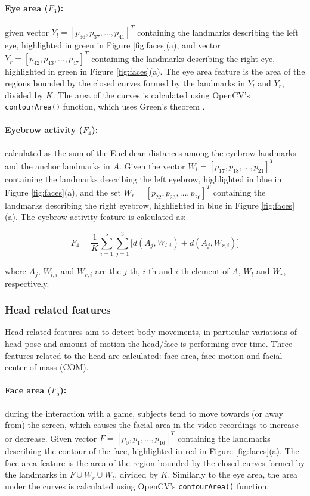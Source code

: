 \paragraph{Eye area ($F_3$):} given vector $Y_l = [p_{36}, p_{37}, \dots, p_{41}]^T$ containing the landmarks describing the left eye, highlighted in green in Figure \ref{fig:faces}(a), and vector $Y_r = [p_{42}, p_{43}, \dots, p_{47}]^T$ containing the landmarks describing the right eye, highlighted in green in Figure \ref{fig:faces}(a). The eye area feature is the area of the regions bounded by the closed curves formed by the landmarks in $Y_l$ and $Y_r$, divided by $K$. The area of the curves is calculated using OpenCV's \texttt{contourArea()} function, which uses Green's theorem \parencite{stewart2011calculus}.

\paragraph{Eyebrow activity ($F_4$):} calculated as the sum of the Euclidean distances among the eyebrow landmarks and the anchor landmarks in $A$. Given the vector $W_l = [p_{17}, p_{18}, \dots, p_{21}]^T$ containing the landmarks describing the left eyebrow, highlighted in blue in Figure \ref{fig:faces}(a), and the set $W_r = [p_{22}, p_{23}, \dots, p_{26}]^T$ containing the landmarks describing the right eyebrow, highlighted in blue in Figure \ref{fig:faces}(a). The eyebrow activity feature is calculated as:

\[
F_4 = \frac{1}{K} \sum_{i=1}^{5} \sum_{j=1}^{3} \Big[ d(A_j, W_{l,i}) + d(A_j, W_{r,i}) \Big]
\]

where $A_j$, $W_{l,i}$ and $W_{r,i}$ are the $j$-th, $i$-th and $i$-th element of $A$, $W_l$ and $W_r$, respectively.

\subsubsection{Head related features}

Head related features aim to detect body movements, in particular variations of head pose and amount of motion the head/face is performing over time. Three features related to the head are calculated: face area, face motion and facial center of mass (COM).

\paragraph{Face area ($F_5$):} during the interaction with a game, subjects tend to move towards (or away from) the screen, which causes the facial area in the video recordings to increase or decrease. Given vector $F = [p_{0}, p_{1}, \dots, p_{16}]^T$ containing the landmarks describing the contour of the face, highlighted in red in Figure \ref{fig:faces}(a). The face area feature is the area of the region bounded by the closed curves formed by the landmarks in $F \cup W_r \cup W_l$, divided by $K$. Similarly to the eye area, the area under the curves is calculated using OpenCV's \texttt{contourArea()} function.

